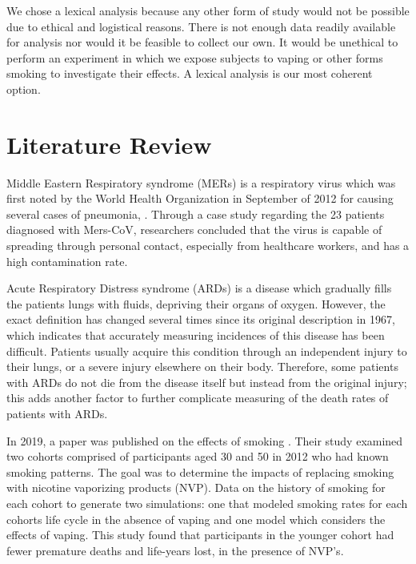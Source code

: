 \documentclass[article]{article}
\begin{document}
We chose a lexical analysis because any other form of study would not be possible due to ethical and logistical reasons. There is not enough data readily available for analysis nor would it be feasible to collect our own. It would be unethical to perform an experiment in which we expose subjects to vaping or other forms smoking to investigate their effects. A lexical analysis is our most coherent option. 

\section{Literature Review}

Middle Eastern Respiratory syndrome (MERs) is a respiratory virus which was first noted by the World Health Organization in September of 2012 for causing several cases of pneumonia, \cite{New England Journal of Medicine}. Through a case study regarding the 23 patients diagnosed with Mers-CoV, researchers concluded that the virus is capable of spreading through personal contact, especially from healthcare workers, and has a high contamination rate.

\medskip

Acute Respiratory Distress syndrome (ARDs) is a disease which gradually fills the patients lungs with fluids, depriving their organs of oxygen. However, the exact definition has changed several times since its original description in 1967, which indicates that accurately measuring incidences of this disease has been difficult. Patients usually acquire this condition through an independent injury to their lungs, or a severe injury elsewhere on their body. Therefore, some patients with ARDs do not die from the disease itself but instead from the original injury; this adds another factor to further complicate measuring of the death rates of patients with ARDs. \cite{Ware, Lorraine B and Matthay, Michael A}

\medskip

In 2019, a paper was published on the effects of smoking \cite{levy2019modeling}. Their study examined two cohorts comprised of participants aged 30 and 50 in 2012 who had known smoking patterns. The goal was to determine the impacts of replacing smoking with nicotine vaporizing products (NVP). Data on the history of smoking for each cohort to generate two simulations: one that modeled smoking rates for each cohorts life cycle in the absence of vaping and one model which considers the effects of vaping. This study found that participants in the younger cohort had fewer premature deaths and life-years lost, in the presence of NVP's.
\end{document}
